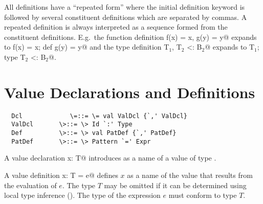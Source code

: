 \documentclass[11pt]{report}
\begin{document}

All definitions have a ``repeated form'' where the initial
definition keyword is followed by several constituent definitions
which are separated by commas.  A repeated definition is
always interpreted as a sequence formed from the
constituent definitions. E.g.\ the function definition
\verb@def f(x) = x, g(y) = y@ expands to
\verb@def f(x) = x; def g(y) = y@ and
the type definition
\verb@type T$_1$, T$_2$ <: B$_2$@ expands to
\verb@type T$_1$; type T$_2$ <: B$_2$@.

\section{Value Declarations and Definitions}
\label{sec:valdef}

\syntax\begin{verbatim}
  Dcl             \=::= \= val ValDcl {`,' ValDcl}
  ValDcl       \>::= \> Id `:' Type
  Def          \>::= \> val PatDef {`,' PatDef}
  PatDef       \>::= \> Pattern `=' Expr
\end{verbatim}

A value declaration \verb@val x: T@ introduces \verb@x@ as a name of a value of
type \verb@T@.  

A value definition \verb@val x: T = e@ defines $x$ as a name of the value
that results from the evaluation of $e$. The type $T$ may be omitted
if it can be determined using local type inference
().  The type of the expression $e$ must
conform to type $T$.
\end{document}
